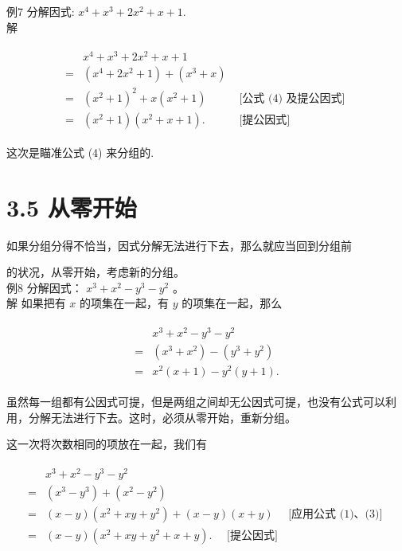 \documentclass[10pt]{article}
\begin{document}
例7 分解因式: $x^{4}+x^{3}+2 x^{2}+x+1$.\\
解

\begin{align*}
\begin{array}{rlr} 
& x^{4}+x^{3}+2 x^{2}+x+1 & \\
= & \left(x^{4}+2 x^{2}+1\right)+\left(x^{3}+x\right) & \\
= & \left(x^{2}+1\right)^{2}+x\left(x^{2}+1\right) & \text { [公式 (4) 及提公因式] } \\
= & \left(x^{2}+1\right)\left(x^{2}+x+1\right) . & \text { [提公因式] }
\end{array}
\end{align*}

这次是瞄准公式 (4) 来分组的.

\section*{3.5 从零开始}
如果分组分得不恰当，因式分解无法进行下去，那么就应当回到分组前

的状况，从零开始，考虑新的分组。\\
例8 分解因式： $x^{3}+x^{2}-y^{3}-y^{2}$ 。\\
解 如果把有 $x$ 的项集在一起，有 $y$ 的项集在一起，那么

\begin{align*}
\begin{aligned}
& x^{3}+x^{2}-y^{3}-y^{2} \\
= & \left(x^{3}+x^{2}\right)-\left(y^{3}+y^{2}\right) \\
= & x^{2}(x+1)-y^{2}(y+1) .
\end{aligned}
\end{align*}

虽然每一组都有公因式可提，但是两组之间却无公因式可提，也没有公式可以利用，分解无法进行下去。这时，必须从零开始，重新分组。

这一次将次数相同的项放在一起，我们有

\begin{align*}
\begin{aligned}
& x^{3}+x^{2}-y^{3}-y^{2} \\
= & \left(x^{3}-y^{3}\right)+\left(x^{2}-y^{2}\right) \\
= & (x-y)\left(x^{2}+x y+y^{2}\right)+(x-y)(x+y) \quad \text { [应用公式 (1)、(3)] } \\
= & (x-y)\left(x^{2}+x y+y^{2}+x+y\right) . \quad \text { [提公因式] }
\end{aligned}
\end{align*}
\end{document}
